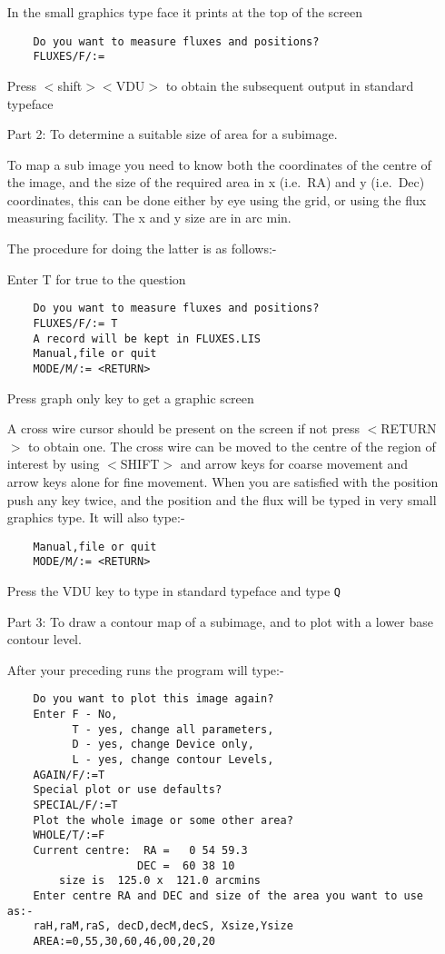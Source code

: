\begin{itemize}
In the small graphics type face it prints at the top of the screen
\begin{verbatim}
    Do you want to measure fluxes and positions?
    FLUXES/F/:=
\end{verbatim}
Press $<$shift$>$$<$VDU$>$ to obtain the subsequent output in standard typeface
\item [Part 2:] To determine a suitable size of area for a subimage. 

To map a sub image you need to know both the coordinates of the centre of the
image, and the size of the required area in x (i.e.\ RA) and y (i.e.\ Dec)
coordinates, this can be done either by eye using the grid, or using the flux
measuring facility. The x and y size are in arc min.


The procedure for doing the latter is as follows:-

Enter T for true to the question
\begin{verbatim}
    Do you want to measure fluxes and positions?
    FLUXES/F/:= T
    A record will be kept in FLUXES.LIS
    Manual,file or quit
    MODE/M/:= <RETURN>
\end{verbatim}
Press graph only key to get a graphic screen

A cross wire cursor should be present on the screen if not press $<$RETURN$>$ to
obtain one. The cross wire can be moved to the centre of the region of interest
by using $<$SHIFT$>$ and arrow keys for coarse movement and arrow keys alone for
fine movement. When you are satisfied with the position push any key twice, and
the position and the flux will be typed in very small graphics type. It will
also type:-
\begin{verbatim}
    Manual,file or quit
    MODE/M/:= <RETURN>
\end{verbatim}
Press the VDU key to type in standard typeface and type {\tt Q}

\pagebreak
\item [Part 3:] To draw a contour map of a subimage, and to plot with a lower 
base contour level.                              

After your preceding runs the program will type:-

\begin{verbatim}
    Do you want to plot this image again?
    Enter F - No,
          T - yes, change all parameters,
          D - yes, change Device only,
          L - yes, change contour Levels,
    AGAIN/F/:=T
    Special plot or use defaults?
    SPECIAL/F/:=T
    Plot the whole image or some other area?
    WHOLE/T/:=F
    Current centre:  RA =   0 54 59.3                                             
                    DEC =  60 38 10                                              
        size is  125.0 x  121.0 arcmins                                          
    Enter centre RA and DEC and size of the area you want to use as:-
    raH,raM,raS, decD,decM,decS, Xsize,Ysize
    AREA:=0,55,30,60,46,00,20,20


\end{verbatim}
\end{itemize}
